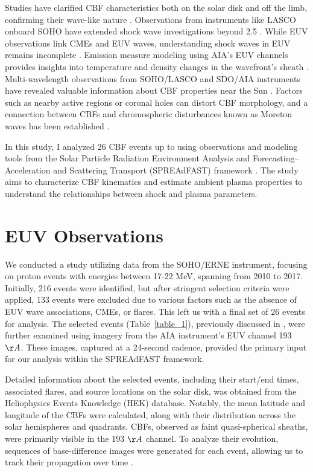 Studies have clarified CBF characteristics both on the solar disk and off the limb, confirming their wave-like nature \citep{nitta_2013, long_2011, olmedo_2012}. Observations from instruments like LASCO onboard SOHO have extended shock wave investigations beyond 2.5 \rsun \citep{domingo_1995, vourlidas_2003}. While EUV observations link CMEs and EUV waves, understanding shock waves in EUV remains incomplete \citep{patsourakos_2009, kozarev_2011}. Emission measure modeling using AIA's EUV channels provides insights into temperature and density changes in the wavefront's sheath \citep{kozarev_2011}. Multi-wavelength observations from SOHO/LASCO and SDO/AIA instruments have revealed valuable information about CBF properties near the Sun \citep{warmuth_2015}.
Factors such as nearby active regions or coronal holes can distort CBF morphology, and a connection between CBFs and chromospheric disturbances known as Moreton waves has been established \citep{ofman_2002, mann_2003, piantschitsch_2018, thompson_1999b}.

In this study, I analyzed 26 CBF events up to \rsun using observations and modeling tools from the Solar Particle Radiation Environment Analysis and Forecasting--Acceleration and Scattering Transport (SPREAdFAST) framework \citep{kozarev_2022}. The study aims to characterize CBF kinematics and estimate ambient plasma properties to understand the relationships between shock and plasma parameters.

\section{EUV Observations}
We conducted a study utilizing data from the SOHO/ERNE instrument, focusing on proton events with energies between 17-22 MeV, spanning from 2010 to 2017. Initially, 216 events were identified, but after stringent selection criteria were applied, 133 events were excluded due to various factors such as the absence of EUV wave associations, CMEs, or flares. This left us with a final set of 26 events for analysis.
The selected events (Table~\ref{table_1}), previously discussed in \citep{kozarev_2022}, were further examined using imagery from the AIA instrument's EUV channel 193 $\AA$. These images, captured at a 24-second cadence, provided the primary input for our analysis within the SPREAdFAST framework.

Detailed information about the selected events, including their start/end times, associated flares, and source locations on the solar disk, was obtained from the Heliophysics Events Knowledge (HEK) database. Notably, the mean latitude and longitude of the CBFs were calculated, along with their distribution across the solar hemispheres and quadrants.
CBFs, observed as faint quasi-spherical sheaths, were primarily visible in the 193 $\AA$ channel. To analyze their evolution, sequences of base-difference images were generated for each event, allowing us to track their propagation over time \citep{vourlidas_2003, ontiveros_2009, kozarev_2011, ma_2011}.

